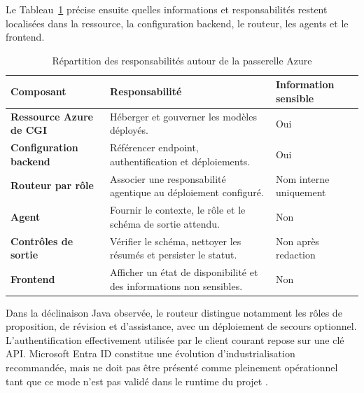 Le Tableau~\ref{tab:responsabilites-azure-ch3} précise ensuite quelles informations et responsabilités restent localisées dans la ressource, la configuration backend, le routeur, les agents et le frontend.

\begin{table}[H]
    \centering
    \caption{Répartition des responsabilités autour de la passerelle Azure}
    \label{tab:responsabilites-azure-ch3}
    \small
    \begin{tabularx}{\textwidth}{|>{\bfseries\RaggedRight\arraybackslash}p{3.8cm}|>{\RaggedRight\arraybackslash}X|>{\centering\arraybackslash}p{3.1cm}|}
        \hline
        \rowcolor{cgilight!95}
        \textbf{Composant} & \textbf{Responsabilité} & \textbf{Information sensible} \\
        \hline
        Ressource Azure de CGI & Héberger et gouverner les modèles déployés. & Oui \\
        \hline
        Configuration backend & Référencer endpoint, authentification et déploiements. & Oui \\
        \hline
        Routeur par rôle & Associer une responsabilité agentique au déploiement configuré. & Nom interne uniquement \\
        \hline
        Agent & Fournir le contexte, le rôle et le schéma de sortie attendu. & Non \\
        \hline
        Contrôles de sortie & Vérifier le schéma, nettoyer les résumés et persister le statut. & Non après redaction \\
        \hline
        Frontend & Afficher un état de disponibilité et des informations non sensibles. & Non \\
        \hline
    \end{tabularx}
\end{table}

Dans la déclinaison Java observée, le routeur distingue notamment les rôles de proposition, de révision et d'assistance, avec un déploiement de secours optionnel. L'authentification effectivement utilisée par le client courant repose sur une clé API. Microsoft Entra ID constitue une évolution d'industrialisation recommandée, mais ne doit pas être présenté comme pleinement opérationnel tant que ce mode n'est pas validé dans le runtime du projet \cite{azure-entra-auth}.

